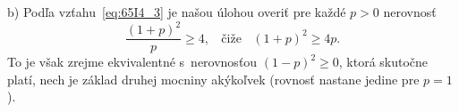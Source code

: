 {b) Podľa vzťahu~\ref{eq:65I4_3} je našou úlohou overiť pre každé $p > 0$ nerovnosť
$$\frac{(1 + p)^2}{p}\geq4,\ \ \ \ \text{čiže} \ \ \ \  (1 + p)^2\geq 4p.$$
To je však zrejme ekvivalentné s~nerovnosťou $(1 -p)^2\geq 0$, ktorá skutočne platí, nech je základ druhej mocniny akýkoľvek (rovnosť nastane jedine pre $p = 1$).

}
